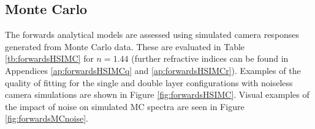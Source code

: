 \subsection{Monte Carlo}\label{sec:MCHSI}
The forwards analytical models are assessed using simulated camera responses generated from Monte Carlo data. 
These are evaluated in Table \ref{tb:forwardsHSIMC} for $n=1.44$ (further refractive indices can be found in Appendices \ref{ap:forwardsHSIMCq} and \ref{ap:forwardsHSIMCr}). Examples of the quality of fitting for the single and double layer configurations with noiseless camera simulations are shown in Figure \ref{fig:forwardsHSIMC}. Visual examples of the impact of noise on simulated MC spectra are seen in Figure \ref{fig:forwardsMCnoise}.

